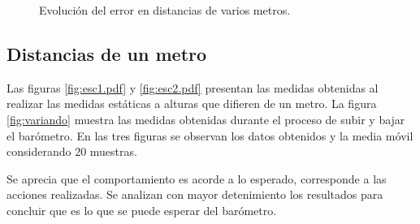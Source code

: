 \documentclass[spanish,12pt,a4paper,titlepage]{report}
\begin{document}
\begin{figure}[H]
\hspace{-50pt}
  \caption{Evolución del error en distancias de varios metros.}
\label{fig:autocorr}
\end{figure}

\newpage
\subsection{Distancias de un metro}

Las figuras \ref{fig:esc1.pdf} y \ref{fig:esc2.pdf} presentan las medidas obtenidas al realizar las medidas estáticas a alturas que difieren de un metro. La figura \ref{fig:variando} muestra las medidas obtenidas durante el proceso de subir y bajar el barómetro. En las tres figuras se observan los datos obtenidos y la media móvil considerando 20 muestras.

Se aprecia que el comportamiento es acorde a lo esperado, corresponde a las acciones realizadas. Se analizan con mayor detenimiento los resultados para concluir que es lo que se puede esperar del barómetro.
\end{document}
